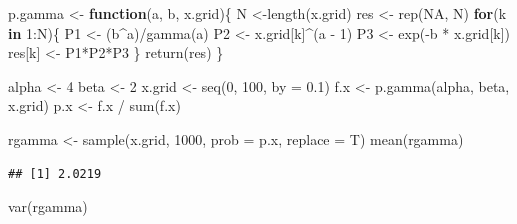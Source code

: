 \documentclass[
  10pt,
  spanish,
]{book}
\newenvironment{Shaded}{\begin{snugshade}}{\end{snugshade}}
\newcommand{\AttributeTok}[1]{\textcolor[rgb]{0.77,0.63,0.00}{#1}}
\newcommand{\ConstantTok}[1]{\textcolor[rgb]{0.00,0.00,0.00}{#1}}
\newcommand{\ControlFlowTok}[1]{\textcolor[rgb]{0.13,0.29,0.53}{\textbf{#1}}}
\newcommand{\DecValTok}[1]{\textcolor[rgb]{0.00,0.00,0.81}{#1}}
\newcommand{\FloatTok}[1]{\textcolor[rgb]{0.00,0.00,0.81}{#1}}
\newcommand{\FunctionTok}[1]{\textcolor[rgb]{0.00,0.00,0.00}{#1}}
\newcommand{\NormalTok}[1]{#1}
\newcommand{\OtherTok}[1]{\textcolor[rgb]{0.56,0.35,0.01}{#1}}
\newcommand{\SpecialCharTok}[1]{\textcolor[rgb]{0.00,0.00,0.00}{#1}}
\theoremstyle{definition}
\theoremstyle{definition}
\theoremstyle{definition}
\theoremstyle{definition}
\theoremstyle{remark}
\begin{document}
\begin{Shaded}
\begin{Highlighting}[]
\NormalTok{p.gamma }\OtherTok{\textless{}{-}} \ControlFlowTok{function}\NormalTok{(a, b, x.grid)\{}
\NormalTok{  N }\OtherTok{\textless{}{-}}\FunctionTok{length}\NormalTok{(x.grid)}
\NormalTok{  res }\OtherTok{\textless{}{-}} \FunctionTok{rep}\NormalTok{(}\ConstantTok{NA}\NormalTok{, N)}
  \ControlFlowTok{for}\NormalTok{(k }\ControlFlowTok{in} \DecValTok{1}\SpecialCharTok{:}\NormalTok{N)\{}
\NormalTok{    P1 }\OtherTok{\textless{}{-}}\NormalTok{ (b}\SpecialCharTok{\^{}}\NormalTok{a)}\SpecialCharTok{/}\FunctionTok{gamma}\NormalTok{(a)}
\NormalTok{    P2 }\OtherTok{\textless{}{-}}\NormalTok{ x.grid[k]}\SpecialCharTok{\^{}}\NormalTok{(a }\SpecialCharTok{{-}} \DecValTok{1}\NormalTok{)}
\NormalTok{    P3 }\OtherTok{\textless{}{-}} \FunctionTok{exp}\NormalTok{(}\SpecialCharTok{{-}}\NormalTok{b }\SpecialCharTok{*}\NormalTok{ x.grid[k])}
\NormalTok{    res[k] }\OtherTok{\textless{}{-}}\NormalTok{ P1}\SpecialCharTok{*}\NormalTok{P2}\SpecialCharTok{*}\NormalTok{P3}
\NormalTok{  \}}
  \FunctionTok{return}\NormalTok{(res)}
\NormalTok{\}}

\NormalTok{alpha }\OtherTok{\textless{}{-}} \DecValTok{4}
\NormalTok{beta }\OtherTok{\textless{}{-}} \DecValTok{2}
\NormalTok{x.grid }\OtherTok{\textless{}{-}} \FunctionTok{seq}\NormalTok{(}\DecValTok{0}\NormalTok{, }\DecValTok{100}\NormalTok{, }\AttributeTok{by =} \FloatTok{0.1}\NormalTok{)}
\NormalTok{f.x }\OtherTok{\textless{}{-}} \FunctionTok{p.gamma}\NormalTok{(alpha, beta, x.grid)}
\NormalTok{p.x }\OtherTok{\textless{}{-}}\NormalTok{ f.x }\SpecialCharTok{/} \FunctionTok{sum}\NormalTok{(f.x)}

\NormalTok{rgamma }\OtherTok{\textless{}{-}} \FunctionTok{sample}\NormalTok{(x.grid, }\DecValTok{1000}\NormalTok{, }\AttributeTok{prob =}\NormalTok{ p.x, }\AttributeTok{replace =}\NormalTok{ T)}
\FunctionTok{mean}\NormalTok{(rgamma)}
\end{Highlighting}
\end{Shaded}

\begin{verbatim}
## [1] 2.0219
\end{verbatim}

\begin{Shaded}
\begin{Highlighting}[]
\FunctionTok{var}\NormalTok{(rgamma)}
\end{Highlighting}
\end{Shaded}
\end{document}

